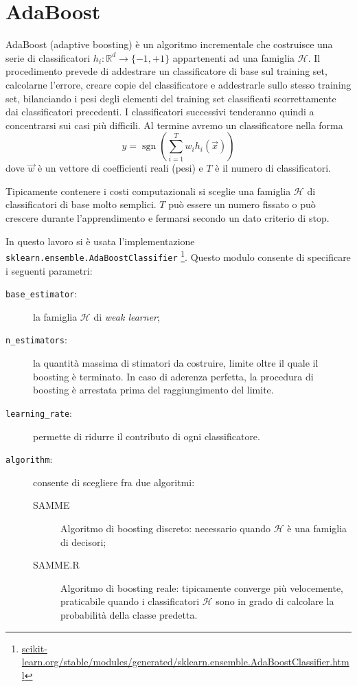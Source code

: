 \documentclass[12pt,a4paper,oneside,hidelinks]{report}
\DeclareMathOperator*{\sgn}{sgn}
\begin{document}
\section{AdaBoost}
AdaBoost (adaptive boosting) è un algoritmo incrementale che costruisce una serie di classificatori $ h_{i}:\mathbb{R}^{d}\rightarrow \{-1,+1\} $ appartenenti ad una famiglia $ \mathcal{H} $. 
Il procedimento prevede di addestrare un classificatore di base sul training set, calcolarne l'errore, creare copie del classificatore e addestrarle sullo stesso training set, bilanciando i pesi degli elementi del training set classificati scorrettamente dai classificatori precedenti. I classificatori successivi tenderanno quindi a concentrarsi sui casi più difficili.
Al termine avremo un classificatore nella forma
\[\hat{y}=\sgn(\sum_{i=1}^{T} w_{i}h_{i}(\vec{x}))\]
dove $ \vec{w} $ è un vettore di coefficienti reali (pesi) e $ T $ è il numero di classificatori.

Tipicamente contenere i costi computazionali si sceglie una famiglia $ \mathcal{H} $ di classificatori di base molto semplici. $ T $ può essere un numero fissato o può crescere durante l'apprendimento e fermarsi secondo un dato criterio di stop.

In questo lavoro si è usata l'implementazione \texttt{sklearn.ensemble.AdaBoostClassifier}
\footnote{\url{scikit-learn.org/stable/modules/generated/sklearn.ensemble.AdaBoostClassifier.html}}.
Questo modulo consente di specificare i seguenti parametri:

\begin{description}
\item[\texttt{base\_estimator}:]la famiglia $ \mathcal{H} $ di \emph{weak learner};
\item[\texttt{n\_estimators}:]la quantità massima di stimatori da costruire, limite oltre il quale il boosting è terminato.
In caso di aderenza perfetta, la procedura di boosting è arrestata prima del raggiungimento del limite.
\item[\texttt{learning\_rate}:] permette di ridurre il contributo di ogni classificatore.
\item[\texttt{algorithm}:]consente di scegliere fra due algoritmi:
\begin{description}
\item[SAMME]Algoritmo di boosting discreto: necessario quando $ \mathcal{H} $ è una famiglia di decisori;
\item[SAMME.R]Algoritmo di boosting reale: tipicamente converge più velocemente, praticabile quando i classificatori $ \mathcal{H} $ sono in grado di calcolare la probabilità della classe predetta.
\end{description}
\end{description}
 
\end{document}
